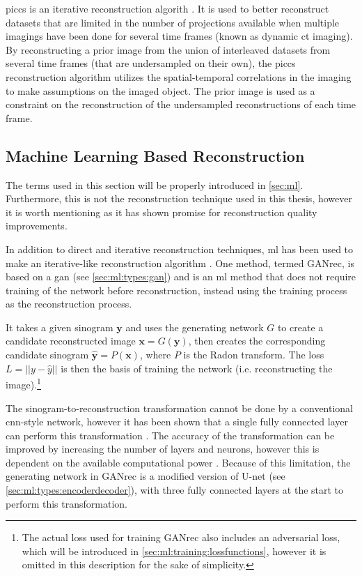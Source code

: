 \Gls{piccs} is an iterative reconstruction algorith \cite{piccs}. It is used to better reconstruct datasets that are limited in the number of projections available when multiple imagings have been done for several time frames (known as dynamic \gls{ct} imaging). By reconstructing a prior image from the union of interleaved datasets from several time frames (that are undersampled on their own), the \gls{piccs} reconstruction algorithm utilizes the spatial-temporal correlations in the imaging to make assumptions on the imaged object. The prior image is used as a constraint on the reconstruction of the undersampled reconstructions of each time frame. 


\subsection{Machine Learning Based Reconstruction}
The terms used in this section will be properly introduced in \cref{sec:ml}. Furthermore, this is not the reconstruction technique used in this thesis, however it is worth mentioning as it has shown promise for reconstruction quality improvements. 

In addition to direct and iterative reconstruction techniques, \gls{ml} has been used to make an iterative-like reconstruction algorithm \cite{GANrec}. One method, termed GANrec, is based on a \gls{gan} (see \cref{sec:ml:types:gan}) and is an \gls{ml} method that does not require training of the network before reconstruction, instead using the training process as the reconstruction process. 

It takes a given sinogram $\bm{y}$ and uses the generating network $G$ to create a candidate reconstructed image $\bm{x} = G(\bm{y})$, then creates the corresponding candidate sinogram $\hat{\bm{y}} = P(\bm{x})$, where $P$ is the Radon transform. The loss $L = \left|\left| y - \hat{y} \right|\right|$ is then the basis of training the network (i.e. reconstructing the image).\footnote{The actual loss used for training GANrec also includes an adversarial loss, which will be introduced in \cref{sec:ml:training:lossfunctions}, however it is omitted in this description for the sake of simplicity. }

The sinogram-to-reconstruction transformation cannot be done by a conventional \gls{cnn}-style network, however it has been shown that a single fully connected layer can perform this transformation \cite{PASCHALIS2004211}. The accuracy of the transformation can be improved by increasing the number of layers and neurons, however this is dependent on the available computational power \cite{GANrec}. Because of this limitation, the generating network in GANrec is a modified version of U-net \cite{unet} (see \cref{sec:ml:types:encoderdecoder}), with three fully connected layers at the start to perform this transformation. 
